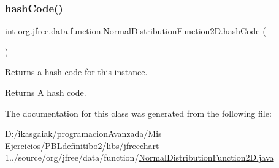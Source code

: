 \subsubsection{\texorpdfstring{hash\+Code()}{hashCode()}}
{\footnotesize\ttfamily int org.\+jfree.\+data.\+function.\+Normal\+Distribution\+Function2\+D.\+hash\+Code (\begin{DoxyParamCaption}{ }\end{DoxyParamCaption})}

Returns a hash code for this instance.

\begin{DoxyReturn}{Returns}
A hash code. 
\end{DoxyReturn}


The documentation for this class was generated from the following file\+:\begin{DoxyCompactItemize}
\item 
D\+:/ikasgaiak/programacion\+Avanzada/\+Mis Ejercicios/\+P\+B\+Ldefinitibo2/libs/jfreechart-\/1../source/org/jfree/data/function/\mbox{\hyperlink{_normal_distribution_function2_d_8java}{Normal\+Distribution\+Function2\+D.\+java}}\end{DoxyCompactItemize}
